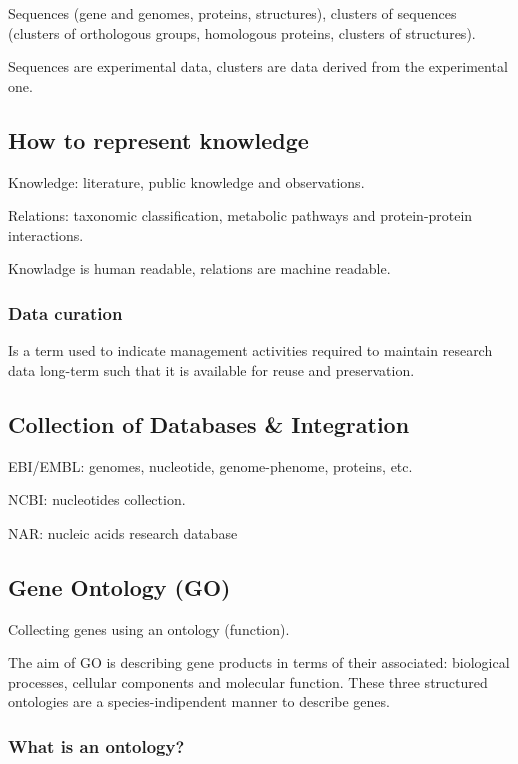 Sequences (gene and genomes, proteins, structures), clusters of sequences (clusters of orthologous groups, homologous proteins, clusters of structures).

Sequences are experimental data, clusters are data derived from the experimental one.

\subsection{How to represent knowledge}

Knowledge: literature, public knowledge and observations.

Relations: taxonomic classification, metabolic pathways and protein-protein interactions.

Knowladge is human readable, relations are machine readable.

\subsubsection{Data curation}

Is a term used to indicate management activities required to maintain research 
data long-term such that it is available for reuse and preservation.

\subsection{Collection of Databases \& Integration}

EBI/EMBL: genomes, nucleotide, genome-phenome, proteins, etc.

NCBI: nucleotides collection.

NAR: nucleic acids research database

\subsection{Gene Ontology (GO)}

Collecting genes using an ontology (function).

The aim of GO is describing gene products in terms of their associated: 
biological processes, cellular components and molecular function. These
three structured ontologies are a species-indipendent manner to describe 
genes.

\subsubsection{What is an ontology?}


